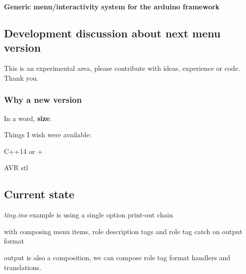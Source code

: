 {\bfseries Generic menu/interactivity system for the arduino framework}

\subsection*{Development discussion about next menu version}

This is an experimental area, please contribute with ideas, experience or code. Thank you.

\subsubsection*{Why a new version}

In a word, {\bfseries size}.

Things I wish were available\+:
\begin{DoxyItemize}
\item C++14 or +
\item A\+VR stl
\end{DoxyItemize}

\subsection*{Current state}

{\itshape tiny.\+ino} example is using a single option print-\/out chain

with composing menu items, role description tags and role tag catch on output format

output is also a composition, we can compose role tag format handlers and translations.


